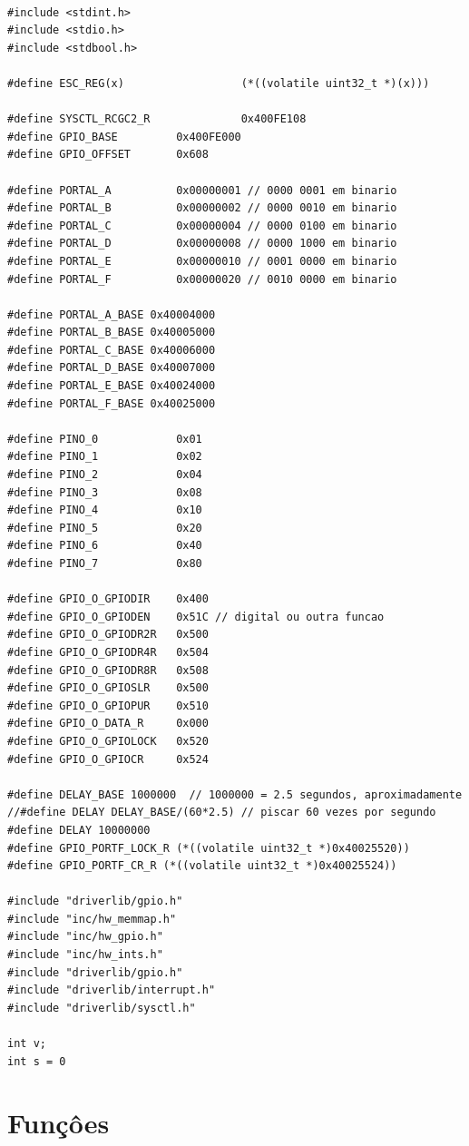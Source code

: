 \documentclass{article}
\begin{document}
\begin{lstlisting}

#include <stdint.h>
#include <stdio.h>
#include <stdbool.h>

#define ESC_REG(x)                  (*((volatile uint32_t *)(x)))

#define SYSCTL_RCGC2_R              0x400FE108
#define GPIO_BASE         0x400FE000
#define GPIO_OFFSET       0x608

#define PORTAL_A          0x00000001 // 0000 0001 em binario
#define PORTAL_B          0x00000002 // 0000 0010 em binario
#define PORTAL_C          0x00000004 // 0000 0100 em binario
#define PORTAL_D          0x00000008 // 0000 1000 em binario
#define PORTAL_E          0x00000010 // 0001 0000 em binario
#define PORTAL_F          0x00000020 // 0010 0000 em binario

#define PORTAL_A_BASE 0x40004000
#define PORTAL_B_BASE 0x40005000
#define PORTAL_C_BASE 0x40006000
#define PORTAL_D_BASE 0x40007000
#define PORTAL_E_BASE 0x40024000
#define PORTAL_F_BASE 0x40025000

#define PINO_0            0x01
#define PINO_1            0x02
#define PINO_2            0x04
#define PINO_3            0x08
#define PINO_4            0x10
#define PINO_5            0x20
#define PINO_6            0x40
#define PINO_7            0x80

#define GPIO_O_GPIODIR    0x400
#define GPIO_O_GPIODEN    0x51C // digital ou outra funcao
#define GPIO_O_GPIODR2R   0x500
#define GPIO_O_GPIODR4R   0x504
#define GPIO_O_GPIODR8R   0x508
#define GPIO_O_GPIOSLR    0x500
#define GPIO_O_GPIOPUR    0x510
#define GPIO_O_DATA_R     0x000
#define GPIO_O_GPIOLOCK   0x520
#define GPIO_O_GPIOCR     0x524

#define DELAY_BASE 1000000  // 1000000 = 2.5 segundos, aproximadamente
//#define DELAY DELAY_BASE/(60*2.5) // piscar 60 vezes por segundo
#define DELAY 10000000
#define GPIO_PORTF_LOCK_R (*((volatile uint32_t *)0x40025520))
#define GPIO_PORTF_CR_R (*((volatile uint32_t *)0x40025524))

#include "driverlib/gpio.h"
#include "inc/hw_memmap.h"
#include "inc/hw_gpio.h"
#include "inc/hw_ints.h"
#include "driverlib/gpio.h"
#include "driverlib/interrupt.h"
#include "driverlib/sysctl.h"

int v;
int s = 0

\end{lstlisting}

\section{Funçôes}
\end{document}
